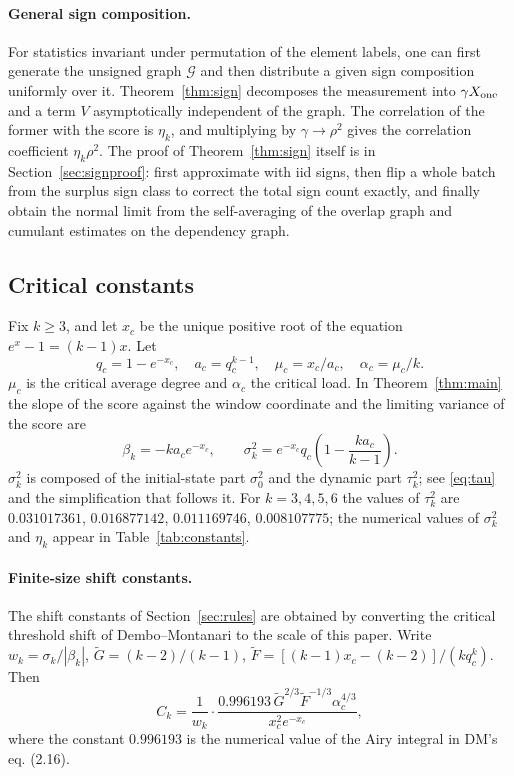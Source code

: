 \paragraph{General sign composition.} For statistics invariant under permutation of the element labels, one
can first generate the unsigned graph $\mathcal G$ and then distribute a given sign composition uniformly
over it. Theorem~\ref{thm:sign} decomposes the measurement into $\gamma X_{\rm one}$ and a term $V$
asymptotically independent of the graph. The correlation of the former with the score is $\eta_k$, and
multiplying by $\gamma\to\rho^2$ gives the correlation coefficient $\eta_k\rho^2$. The proof of
Theorem~\ref{thm:sign} itself is in Section~\ref{sec:signproof}: first approximate with iid signs, then flip
a whole batch from the surplus sign class to correct the total sign count exactly, and finally obtain the
normal limit from the self-averaging of the overlap graph and cumulant estimates on the dependency graph.

\subsection{Critical constants}\label{app:constants}
Fix $k\ge3$, and let $x_c$ be the unique positive root of the equation $e^{x}-1=(k-1)x$\cite{molloy,dn,jl07}. Let
\begin{equation*}
q_c=1-e^{-x_c},\quad a_c=q_c^{k-1},\quad
\mu_c=x_c/a_c,\quad\alpha_c=\mu_c/k.
\end{equation*}
$\mu_c$ is the critical average degree and $\alpha_c$ the critical load. In Theorem~\ref{thm:main} the slope
of the score against the window coordinate and the limiting variance of the score are
\begin{equation*}
\beta_k=-ka_ce^{-x_c},\qquad
\sigma_k^2=e^{-x_c}q_c\left(1-\frac{k a_c}{k-1}\right).
\end{equation*}
$\sigma_k^2$ is composed of the initial-state part $\sigma_0^2$ and the dynamic part $\tau_k^2$; see
\eqref{eq:tau} and the simplification that follows it. For $k=3,4,5,6$ the values of $\tau_k^2$ are
$0.031017361$, $0.016877142$, $0.011169746$, $0.008107775$; the numerical values of $\sigma_k^2$ and
$\eta_k$ appear in Table~\ref{tab:constants}.

\paragraph{Finite-size shift constants.}\label{app:ck}
The shift constants of Section~\ref{sec:rules} are obtained by converting the critical threshold shift of
Dembo--Montanari\cite{dm} to the scale of this paper. Write $w_k=\sigma_k/|\beta_k|$,
$\widetilde G=(k-2)/(k-1)$, $\widetilde F=[(k-1)x_c-(k-2)]/(kq_c^k)$. Then
\begin{equation*}
C_k=\frac{1}{w_k}\cdot\frac{0.996193\,\widetilde G^{2/3}\widetilde F^{-1/3}\alpha_c^{4/3}}{x_c^2e^{-x_c}},
\end{equation*}
where the constant $0.996193$ is the numerical value of the Airy integral in DM's eq. (2.16).

